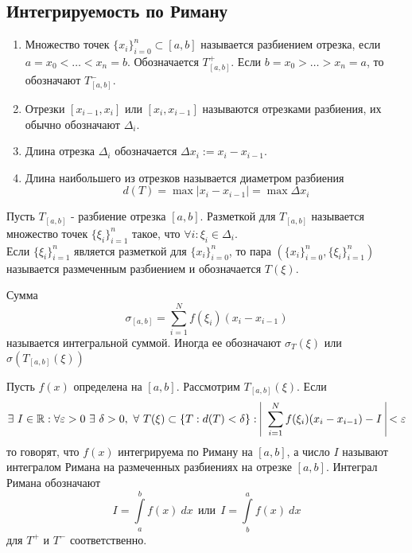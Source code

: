 \subsection{Интегрируемость по Риману}
\begin{definition}\tab
    \begin{enumerate}
        \item Множество точек $\{x_i\}_{i=0}^n\subset [a,b]$ называется разбиением отрезка, если $a=x_0<\dots<x_n=b$. Обозначается $T_{[a,b]}^+$. Если $b=x_0>\dots>x_n=a$, то обозначают $T_{[a,b]}^-$.
        \item Отрезки $[x_{i-1},x_i]$ или $[x_i, x_{i-1}]$ называются отрезками разбиения, их обычно обозначают $\Delta_i$.
        \item Длина отрезка $\Delta_i$ обозначается $\Delta x_i := x_i-x_{i-1}$.
        \item Длина наибольшего из отрезков называется диаметром разбиения \[d(T)=\max|x_i-x_{i-1}| = \max{\Delta x_i}\]
    \end{enumerate} 
\end{definition} 
\begin{definition}
    Пусть $T_{[a,b]}$ - разбиение отрезка $[a,b]$. Разметкой для $T_{[a,b]}$ называется множество точек $\{\xi_i\}_{i=1}^n$ такое, что $\forall i: \xi_i \in \Delta_i$.\\
    Если $\{\xi_i\}_{i=1}^n$ является разметкой для $\{x_i\}_{i=0}^n$, то пара $\left(\{x_i\}_{i=0}^n, \{\xi_i\}_{i=1}^n\right)$ называется размеченным разбиением и обозначается $T(\xi)$.
\end{definition} 
\begin{definition}
    Сумма 
    \[\sigma_{[a,b]}=\sum\limits_{i=1}^{N}f(\xi_i)(x_i-x_{i-1})\]
    называется интегральной суммой. Иногда ее обозначают $\sigma_T(\xi)$ или $\sigma(T_{[a,b]}(\xi))$
\end{definition} 
\begin{definition}
    Пусть $f(x)$ определена на $[a,b]$. Рассмотрим $T_{[a,b]}(\xi)$. Если
    \[\exists\ I\in \R: \forall \epsilon>0\ \exists\ \delta>0,\ \forall\ T(\xi)\subset \{T:d(T)<\delta\}:\ \vline\ \sum\limits_{i=1}^{N}f(\xi_i)(x_i-x_{i-1})-I\ \vline <\epsilon\]
    то говорят, что $f(x)$ интегрируема по Риману на $[a,b]$, а число $I$ называют интегралом Римана на размеченных разбиениях на отрезке $[a,b]$. Интеграл Римана обозначают
    \[I=\int\limits_{a}^{b}f(x)\ dx\ \ \text{или}\ \ I=\int\limits_{b}^{a}f(x)\ dx\]
    для $T^+$ и $T^-$ соответственно. 
\end{definition} 
